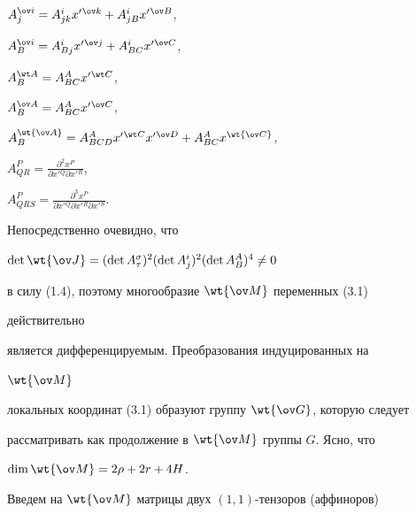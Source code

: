 $A^{\ov i}_j=A^i_{jk}x'{}^{\ov k}+A^i_{jB}x'{}^{\ov B}$,


$A^{\ov i}_B=A^i_{Bj}x'{}^{\ov j}+A^i_{BC}x'{}^{\ov C}$,


$A^{\wt A}_B=A^A_{BC}x'{}^{\wt C}$,


$A^{\ov A}_B=A^A_{BC}x'{}^{\ov C}$,


$A^{\wt{\ov A}}_B=A^A_{BCD}x'{}^{\wt C}x'{}^{\ov D}+


A^A_{BC}x^{\wt{\ov C}}$,


$A^P_{QR}=\frac{\partial^2 x^P}


{\partial x'{}^Q\partial x'{}^R}$,


$A^P_{QRS}=\frac{\partial^3 x^P}


{\partial x'{}^Q\partial x'{}^R\partial x'{}^S}$.


Непосредственно очевидно, что 


$\det\wt{\ov J}=(\det A^\sigma_\tau)^2


(\det A^i_j)^2(\det A^A_B)^4\ne 0$


в силу (1.4), поэтому многообразие $\wt{\ov M}$ переменных (3.1)


действительно 


является дифференцируемым. Преобразования индуцированных на


$\wt{\ov M}$


локальных координат (3.1) образуют группу $\wt{\ov G}$, которую следует


рассматривать как продолжение в $\wt{\ov M}$ группы $G$. Ясно, что


$\dim\wt{\ov M}=2\rho+2r+4H$.





Введем на $\wt{\ov M}$ матрицы двух $(1,1)$-тензоров (аффиноров)



